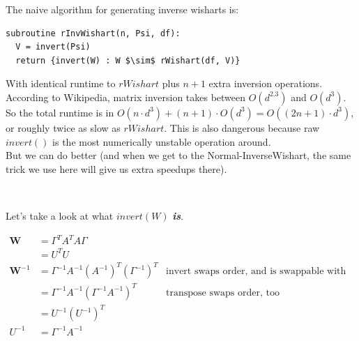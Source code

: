 \documentclass[english]{report}
\begin{document}

The naive algorithm for generating inverse wisharts is:

\begin{lstlisting}
subroutine rInvWishart(n, Psi, df):
  V = invert(Psi)
  return {invert(W) : W $\sim$ rWishart(df, V)}
\end{lstlisting}


With identical runtime to $rWishart$ plus $n+1$ extra inversion
operations. According to Wikipedia,  matrix inversion takes between
$O(d^{2.3})$ and $O(d^{3})$. So the total runtime is in $O(n\cdot d^{3})+(n+1)\cdot O(d^{3})=O((2n+1)\cdot d^{3})$,
or roughly twice as slow as $rWishart$. This is also dangerous because
raw $invert()$ is the most numerically unstable operation around.\\


But we can do better (and when we get to the Normal-InverseWishart,
the same trick we use here will give us extra speedups there).

~

Let's take a look at what $invert(W)$ \textbf{\emph{is}}. 

\begin{align*}
\mathbf{W} & =\Gamma^{T}A^{T}A\Gamma\\
 & =U^{T}U\\
\mathbf{W}^{-1} & =\Gamma^{-1}A^{-1}\left(A^{-1}\right)^{T}\left(\Gamma^{-1}\right)^{T} & \text{invert swaps order, and is swappable with transpose}\\
 & =\Gamma^{-1}A^{-1}\left(\Gamma^{-1}A^{-1}\right)^{T} & \text{transpose swaps order, too}\\
 & =U^{-1}\left(U^{-1}\right)^{T}\\
U^{-1} & =\Gamma^{-1}A^{-1}
\end{align*}

%



\end{document}
